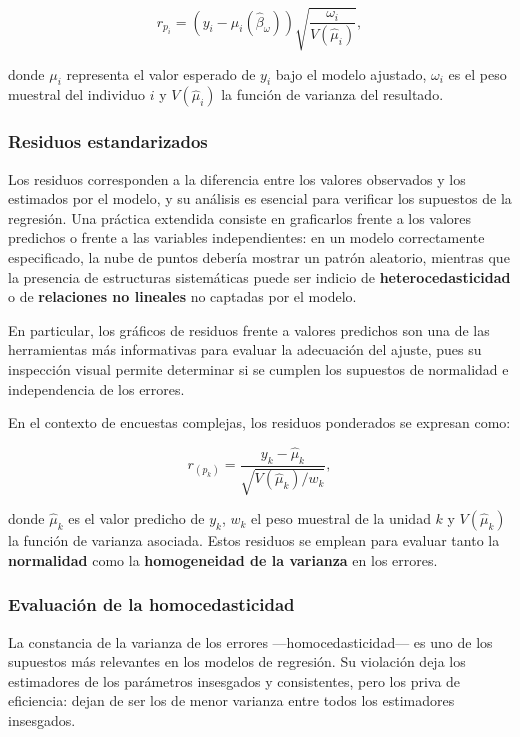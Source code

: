 \documentclass[
  spanish,
  12pt,
]{book}
\begin{document}
\[
r_{p_{i}} = \left(y_{i} - \mu_{i}(\hat{\beta}_{\omega})\right) \sqrt{\frac{\omega_{i}}{V(\hat{\mu}_{i})}},
\]

donde \(\mu_{i}\) representa el valor esperado de \(y_{i}\) bajo el modelo ajustado, \(\omega_{i}\) es el peso muestral del individuo \(i\) y \(V(\hat{\mu}_{i})\) la función de varianza del resultado.

\subsubsection{Residuos estandarizados}\label{residuos-estandarizados}

Los residuos corresponden a la diferencia entre los valores observados y los estimados por el modelo, y su análisis es esencial para verificar los supuestos de la regresión. Una práctica extendida consiste en graficarlos frente a los valores predichos o frente a las variables independientes: en un modelo correctamente especificado, la nube de puntos debería mostrar un patrón aleatorio, mientras que la presencia de estructuras sistemáticas puede ser indicio de \textbf{heterocedasticidad} o de \textbf{relaciones no lineales} no captadas por el modelo.

En particular, los gráficos de residuos frente a valores predichos son una de las herramientas más informativas para evaluar la adecuación del ajuste, pues su inspección visual permite determinar si se cumplen los supuestos de normalidad e independencia de los errores.

En el contexto de encuestas complejas, los residuos ponderados se expresan como:

\[
r_{(p_k)} = \frac{y_k - \hat{\mu}_k}{\sqrt{V(\hat{\mu}_k)/w_k}},
\]

donde \(\hat{\mu}_k\) es el valor predicho de \(y_k\), \(w_k\) el peso muestral de la unidad \(k\) y \(V(\hat{\mu}_k)\) la función de varianza asociada. Estos residuos se emplean para evaluar tanto la \textbf{normalidad} como la \textbf{homogeneidad de la varianza} en los errores.

\subsubsection{Evaluación de la homocedasticidad}\label{evaluaciuxf3n-de-la-homocedasticidad}

La constancia de la varianza de los errores ---homocedasticidad--- es uno de los supuestos más relevantes en los modelos de regresión. Su violación deja los estimadores de los parámetros insesgados y consistentes, pero los priva de eficiencia: dejan de ser los de menor varianza entre todos los estimadores insesgados.
\end{document}
